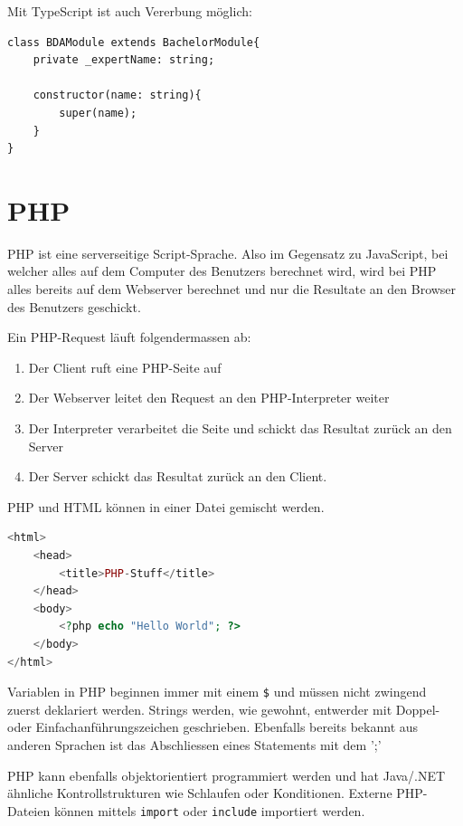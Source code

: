 \documentclass[a4paper, 11pt]{article}
\newcommand{\code}[1]{\texttt{#1}}
\begin{document}
Mit TypeScript ist auch Vererbung möglich:
\begin{lstlisting}
class BDAModule extends BachelorModule{
	private _expertName: string;
	
	constructor(name: string){
		super(name);
	}
}
\end{lstlisting}

\section{PHP}
PHP ist eine serverseitige Script-Sprache. Also im Gegensatz zu JavaScript, bei welcher alles auf dem Computer des Benutzers berechnet wird, wird bei PHP alles bereits auf dem Webserver berechnet und nur die Resultate an den Browser des Benutzers geschickt. 

Ein PHP-Request läuft folgendermassen ab:

\begin{enumerate}
	\item Der Client ruft eine PHP-Seite auf
	\item Der Webserver leitet den Request an den PHP-Interpreter weiter
	\item Der Interpreter verarbeitet die Seite und  schickt das Resultat zurück an den Server
	\item Der Server schickt das Resultat zurück an den Client.
\end{enumerate}

PHP und HTML können in einer Datei gemischt werden.

\begin{lstlisting}[language=php]
<html>
	<head>
		<title>PHP-Stuff</title>
	</head>
	<body>
		<?php echo "Hello World"; ?>
	</body>
</html>
\end{lstlisting}

Variablen in PHP beginnen immer mit einem \code{\$} und müssen nicht zwingend zuerst deklariert werden. Strings werden, wie gewohnt, entwerder mit Doppel- oder Einfachanführungszeichen geschrieben. Ebenfalls bereits bekannt aus anderen Sprachen ist das Abschliessen eines Statements mit dem ';'

\vspace{10px}

\noindent PHP kann ebenfalls objektorientiert programmiert werden und hat Java/.NET ähnliche Kontrollstrukturen wie Schlaufen oder Konditionen. Externe PHP-Dateien können mittels \code{import} oder \code{include} importiert werden.

\vspace{10px}
\end{document}

